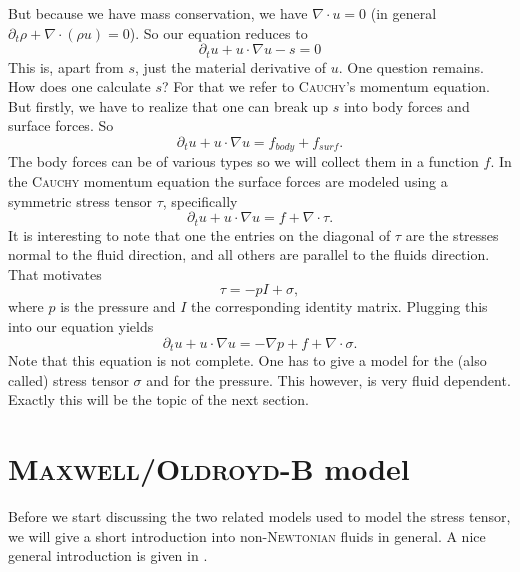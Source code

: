 \documentclass[12pt,a4paper,twoside, open=right]{scrreprt}
\theoremstyle{definition}
\theoremstyle{plain}
\begin{document}
But because we have mass conservation, we have $\nabla\cdot u =0$ (in general $\partial_t \rho + \nabla\cdot(\rho u) =0$). So our equation reduces to 
\begin{equation}
    \partial_t u+ u\cdot \nabla u -s =0
\end{equation}
This is, apart from $s$, just the material derivative of $u$.
One question remains. How does one calculate $s$? For that we refer to \textsc{Cauchy}'s momentum equation. But firstly, we have to realize that one can break up $s$ into body forces and surface forces. So 
\begin{equation}
   \partial_t u + u\cdot \nabla u = f_{body} +f_{surf} .
\end{equation}
The body forces can be of various types so we will collect them in a function $f$. In the \textsc{Cauchy} momentum equation the surface forces are modeled using a symmetric stress tensor $\tau$, specifically
\begin{equation}
    \partial_t u + u\cdot \nabla u = f + \nabla\cdot\tau.
\end{equation}
It is interesting to note that one the entries on the diagonal of $\tau$ are the stresses normal to the fluid direction, and all others are parallel to the fluids direction. That motivates 
\begin{equation}
    \tau = -pI+\sigma,
\end{equation}
where $p$ is the pressure and $I$ the corresponding identity matrix. Plugging this into our equation yields
\begin{equation}
    \partial_t u + u\cdot \nabla u = -\nabla p + f + \nabla\cdot\sigma.
\end{equation}
Note that this equation is not complete. One has to give a model for the (also called) stress tensor $\sigma$ and for the pressure. This however, is very fluid dependent. Exactly this will be the topic of the next section.
\section{\textsc{Maxwell/Oldroyd-B} model}
\label{sec:physics}

Before we start discussing the two related models used to model the stress tensor, we will give a short introduction into non-\textsc{Newtonian} fluids in general. A nice general introduction is given in \cite{Ouellette2013}.
\end{document}

